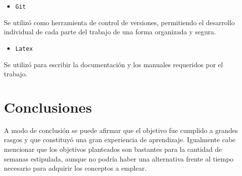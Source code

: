 \documentclass[a4paper]{article}
\begin{document}
\begin{itemize}
	\item \texttt{Git}
\end{itemize}

Se utilizó como herramienta de control de versiones, permitiendo el desarrollo individual de cada parte del trabajo de una forma organizada y segura.

\begin{itemize}
	\item \texttt{Latex} 
\end{itemize} 

Se utilizó para escribir la documentación y los manuales requeridos por el trabajo.

\section{Conclusiones}

A modo de conclusión se puede afirmar que el objetivo fue cumplido a grandes rasgos y que constituyó una gran experiencia de aprendizaje. Igualmente cabe mencionar que los objetivos planteados son bastantes para la cantidad de semanas estipulada, aunque no podría haber una alternativa frente al tiempo necesario para adquirir los conceptos a emplear.
\end{document}
